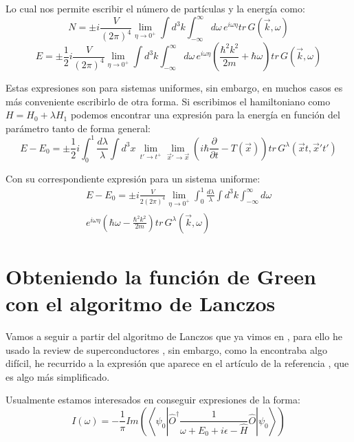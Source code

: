 \documentclass{article} %
\begin{document}
Lo cual nos permite escribir el número de partículas y la energía como:
\begin{equation}
    N = \pm i\frac{V}{(2\pi)^4}\lim_{\eta\to 0^+}\int d^3k \int_{-\infty}^{\infty} d\omega \, e^{i\omega\eta}tr \, G(\vec{k}, \omega)
\end{equation}
\begin{equation}
    E = \pm \frac{1}{2} i\frac{V}{(2\pi)^4}\lim_{\eta\to 0^+}\int d^3k \int_{-\infty}^{\infty} d\omega \, e^{i\omega\eta}\left(\frac{\hbar^2 k^2}{2m} + \hbar\omega\right)tr \, G(\vec{k}, \omega)
\end{equation}

Estas expresiones son para sistemas uniformes, sin embargo, en muchos casos es más conveniente escribirlo de otra forma. Si escribimos el hamiltoniano como $H = H_0 + \lambda H_1$ podemos encontrar una expresión para la energía en función del parámetro tanto de forma general:
\begin{equation}
    E - E_0 = \pm\frac{1}{2}i\int_0^1\frac{d\lambda}{\lambda}\int d^3x \, \lim_{t'\to t^+}\lim_{\vec{x}'\to\vec{x}}\left(i\hbar\frac{\partial}{\partial t} - T(\vec{x})\right)tr \, G^{\lambda}(\vec{x}t, \vec{x}'t')
\end{equation}

Con su correspondiente expresión para un sistema uniforme:
\begin{equation}
    \begin{split}
        E - E_0 = \pm i\frac{V}{2(2\pi)^4}\lim_{\eta\to 0^+}\int_0^1\frac{d\lambda}{\lambda}\int d^3k \int_{-\infty}^{\infty} d\omega \\ e^{i\omega\eta}\left(\hbar\omega - \frac{\hbar^2 k^2}{2m}\right)tr \, G^{\lambda}(\vec{k}, \omega)
    \end{split}
\end{equation}
\section{Obteniendo la función de Green con el algoritmo de Lanczos}

Vamos a seguir a partir del algoritmo de Lanczos que ya vimos en \cite{LuisLanczos}, para ello he usado la review de superconductores \cite{RevModPhys.66.763}, sin embargo, como la encontraba algo difícil, he recurrido a la expresión que aparece en el artículo de la referencia \cite{GreeneDiniz2024}, que es algo más simplificado.

Usualmente estamos interesados en conseguir expresiones de la forma:
$$
I(\omega) = -\frac{1}{\pi}Im\left(\left\langle\psi_0 \left|\hat{O}^{\dagger}\frac{1}{\omega + E_0 + i\epsilon - \hat{H}}\hat{O}\right|\psi_0\right\rangle\right)
$$
\end{document}
